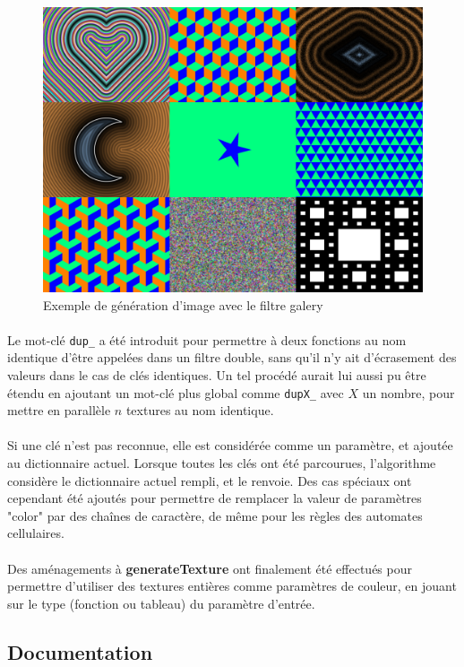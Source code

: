\documentclass[a4paper]{article}
\begin{document}
\begin{figure}
    \centering
    \includegraphics[width=0.6\columnwidth]{galery.png}
    \caption{Exemple de génération d'image avec le filtre galery}
    \label{fig:galery}
\end{figure}

\paragraph{}
Le mot-clé \texttt{dup\_} a été introduit pour permettre à deux fonctions au nom identique d'être appelées dans un filtre double, sans qu'il n'y ait d'écrasement des valeurs dans le cas de clés identiques. Un tel procédé aurait lui aussi pu être étendu en ajoutant un mot-clé plus global comme \texttt{dupX\_} avec $X$ un nombre, pour mettre en parallèle $n$ textures au nom identique.

\paragraph{}
Si une clé n'est pas reconnue, elle est considérée comme un paramètre, et ajoutée au dictionnaire actuel. Lorsque toutes les clés ont été parcourues, l'algorithme considère le dictionnaire actuel rempli, et le renvoie. Des cas spéciaux ont cependant été ajoutés pour permettre de remplacer la valeur de paramètres "color" par des chaînes de caractère, de même pour les règles des automates cellulaires.

\paragraph{}
Des aménagements à \textbf{generateTexture} ont finalement été effectués pour permettre d'utiliser des textures entières comme paramètres de couleur, en jouant sur le type (fonction ou tableau) du paramètre d'entrée.



\subsection{Documentation}
\label{sec:doc}
\end{document}
